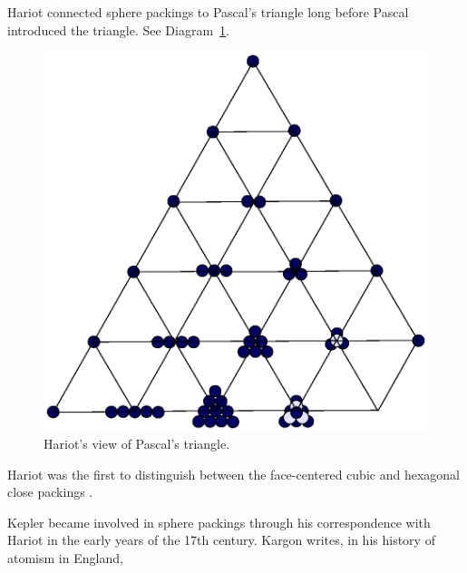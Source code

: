 \smallskip
Hariot connected sphere packings to Pascal's triangle long before
Pascal introduced the triangle. See Diagram~\ref{fig:pascal}.

\begin{figure}[htb]
  \centering
  \includegraphics{PS/diag21.ps}
  \caption{Hariot's view of Pascal's triangle.}
  \label{fig:pascal}
\end{figure}

Hariot was the first to distinguish between the face-centered
cubic and hexagonal close packings \cite[p.52]{Mas66}.

Kepler became involved in sphere packings through his correspondence
with Hariot in the early years of the 17th century.
Kargon writes, in his history of atomism in England,


